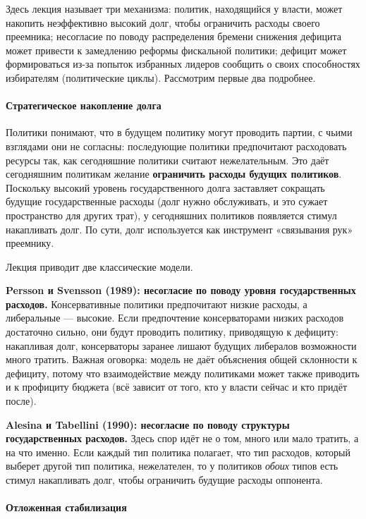 \documentclass[11pt,a4paper]{article}
\begin{document}
Здесь лекция называет три механизма: политик, находящийся у власти, может накопить неэффективно высокий долг, чтобы ограничить расходы своего преемника; несогласие по поводу распределения бремени снижения дефицита может привести к замедлению реформы фискальной политики; дефицит может формироваться из-за попыток избранных лидеров сообщить о своих способностях избирателям (политические циклы). Рассмотрим первые два подробнее.

\paragraph{Стратегическое накопление долга}

Политики понимают, что в будущем политику могут проводить партии, с чьими взглядами они не согласны: последующие политики предпочитают расходовать ресурсы так, как сегодняшние политики считают нежелательным. Это даёт сегодняшним политикам желание \textbf{ограничить расходы будущих политиков}. Поскольку высокий уровень государственного долга заставляет сокращать будущие государственные расходы (долг нужно обслуживать, и это сужает пространство для других трат), у сегодняшних политиков появляется стимул накапливать долг. По сути, долг используется как инструмент «связывания рук» преемнику.

Лекция приводит две классические модели.

\textbf{Persson и Svensson (1989): несогласие по поводу уровня государственных расходов.} Консервативные политики предпочитают низкие расходы, а либеральные --- высокие. Если предпочтение консерваторами низких расходов достаточно сильно, они будут проводить политику, приводящую к дефициту: накапливая долг, консерваторы заранее лишают будущих либералов возможности много тратить. Важная оговорка: модель не даёт объяснения общей склонности к дефициту, потому что взаимодействие между политиками может также приводить и к профициту бюджета (всё зависит от того, кто у власти сейчас и кто придёт после).

\textbf{Alesina и Tabellini (1990): несогласие по поводу структуры государственных расходов.} Здесь спор идёт не о том, много или мало тратить, а на что именно. Если каждый тип политика полагает, что тип расходов, который выберет другой тип политика, нежелателен, то у политиков \emph{обоих} типов есть стимул накапливать долг, чтобы ограничить будущие расходы оппонента.

\paragraph{Отложенная стабилизация}
\end{document}
